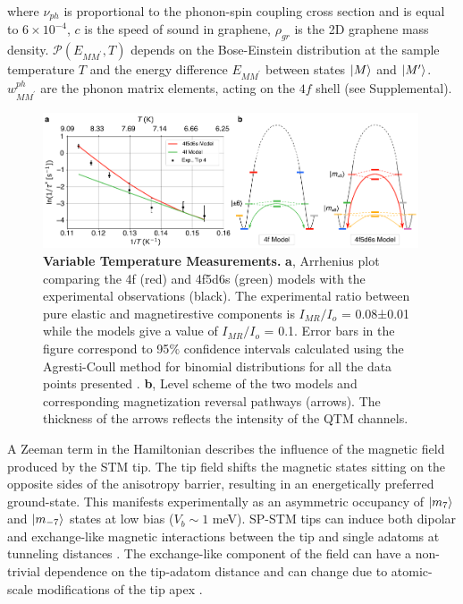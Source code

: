 \documentclass[
reprint,amsmath,amssymb,aps]{revtex4-2}
\begin{document}
where $\nu_{ph}$ is proportional to the phonon-spin coupling cross section and is equal to $6 \times 10^{-4}$, $c$ is the speed of sound in graphene, $\rho_{gr}$ is the 2D graphene mass density. $\mathcal{P}\left( E_{MM^{\prime}}, T \right)$ depends on the Bose-Einstein distribution at the sample temperature $T$ and the energy difference $E_{MM^{\prime}}$ between states $\ket{M}$ and $\ket{M^{\prime}}$. $w^{ph}_{MM^{\prime}}$ are the phonon matrix elements, acting on the $4f$ shell (see Supplemental).

\begin{figure}[t!]
\includegraphics[width=0.99\textwidth]{Fig3_new.pdf}
\caption{\textbf{Variable Temperature Measurements.} \textbf{a}, Arrhenius plot comparing the 4f (red) and 4f5d6s (green) models with the experimental observations (black). The experimental ratio between pure elastic and magnetirestive components is $I_{MR}/I_{o}$ = 0.08±0.01 while the models give a value of $I_{MR}/I_{o}$ = 0.1. Error bars in the figure correspond to 95$\%$ confidence intervals calculated using the Agresti-Coull method for binomial distributions for all the data points presented \citep{agresti1998}. \textbf{b}, Level scheme of the two models and corresponding magnetization reversal pathways (arrows). The thickness of the arrows reflects the intensity of the QTM channels.
\label{fig:temp} }
\end{figure}

A Zeeman term in the Hamiltonian describes the influence of the magnetic field produced by the STM tip. The tip field shifts the magnetic states sitting on the opposite sides of the anisotropy barrier, resulting in an energetically preferred ground-state. This manifests experimentally as an asymmetric occupancy of $\ket{m_7}$ and $\ket{m_{-7}}$ states at low bias ($V_b\sim1$ meV). SP-STM tips can induce both dipolar and exchange-like magnetic interactions between the tip and single adatoms at tunneling distances \cite{yang2019}. The exchange-like component of the field can have a non-trivial dependence on the tip-adatom distance and can change due to atomic-scale modifications of the tip apex \cite{hauptmannQuantifyingExchangeForces2020,tao_SwitchingSingleSpin_2009,lazoFirstprinciplesStudyMagnetic2011,lazoRoleTipSize2008}.
\end{document}
